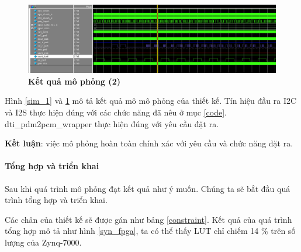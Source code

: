 \begin{figure}[H]
    \centering
    \includegraphics[width=15cm]{Images/Chuong5/fpga/sim_2.png}
    \caption[Kết quả mô phỏng (2)]{\bfseries \fontsize{12pt}{0pt}\selectfont Kết quả mô phỏng (2)}
    \label{sim_2}
\end{figure}

Hình \ref{sim_1} và \ref{sim_2} mô tả kết quả mô mô phỏng của thiết kế. Tín hiệu đầu ra I2C và I2S thực hiện đúng với các chức năng đã nêu ở mục \ref{code}. dti\_pdm2pcm\_wrapper thực hiện đúng với yêu cầu đặt ra.

\textbf{Kết luận}: việc mô phỏng hoàn toàn chính xác với yêu cầu và chức năng đặt ra.

\paragraph{Tổng hợp và triển khai}

Sau khi quá trình mô phỏng đạt kết quả như ý muốn. Chúng ta sẽ bắt đầu quá trình tổng hợp và triển khai.

Các chân của thiết kế sẽ được gán như bảng \ref{constraint}. Kết quả của quá trình tổng hợp mô tả như hình \ref{syn_fpga}, ta có thể thấy LUT chỉ chiếm 14 \% trên số lượng của Zynq-7000.

